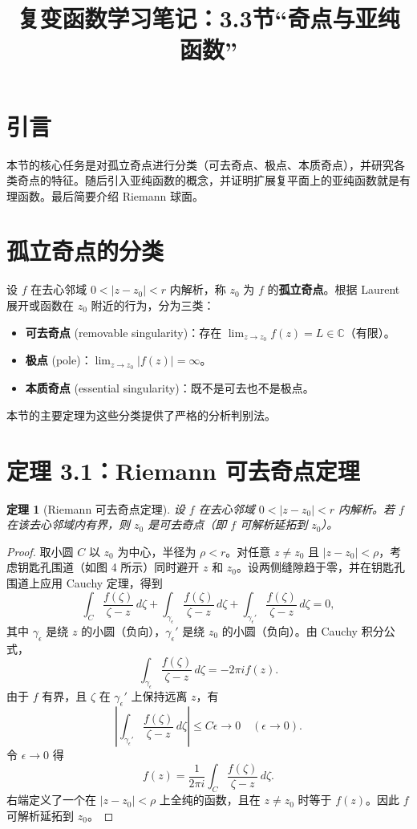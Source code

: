 \documentclass[UTF8]{ctexart}
\title{复变函数学习笔记：3.3节“奇点与亚纯函数”}
\date{}
\newtheorem{theorem}{定理}[section]
\numberwithin{equation}{section}
\newcommand{\CC}{\mathbb{C}}
\begin{document}
\maketitle

\section{引言}
本节的核心任务是对孤立奇点进行分类（可去奇点、极点、本质奇点），并研究各类奇点的特征。随后引入亚纯函数的概念，并证明扩展复平面上的亚纯函数就是有理函数。最后简要介绍 Riemann 球面。

\section{孤立奇点的分类}
设 \(f\) 在去心邻域 \(0<|z-z_0|<r\) 内解析，称 \(z_0\) 为 \(f\) 的\textbf{孤立奇点}。根据 Laurent 展开或函数在 \(z_0\) 附近的行为，分为三类：
\begin{itemize}
\item \textbf{可去奇点} (removable singularity)：存在 \(\lim_{z\to z_0} f(z) = L\in \CC\)（有限）。
\item \textbf{极点} (pole)：\(\lim_{z\to z_0} |f(z)| = \infty\)。
\item \textbf{本质奇点} (essential singularity)：既不是可去也不是极点。
\end{itemize}
本节的主要定理为这些分类提供了严格的分析判别法。

\section{定理 3.1：Riemann 可去奇点定理}
\begin{theorem}[Riemann 可去奇点定理]
设 \(f\) 在去心邻域 \(0<|z-z_0|<r\) 内解析。若 \(f\) 在该去心邻域内有界，则 \(z_0\) 是可去奇点（即 \(f\) 可解析延拓到 \(z_0\)）。
\end{theorem}

\begin{proof}
取小圆 \(C\) 以 \(z_0\) 为中心，半径为 \(\rho<r\)。对任意 \(z\neq z_0\) 且 \(|z-z_0|<\rho\)，考虑钥匙孔围道（如图 4 所示）同时避开 \(z\) 和 \(z_0\)。设两侧缝隙趋于零，并在钥匙孔围道上应用 Cauchy 定理，得到
\[
\int_C \frac{f(\zeta)}{\zeta-z}\,d\zeta + \int_{\gamma_\epsilon} \frac{f(\zeta)}{\zeta-z}\,d\zeta + \int_{\gamma_\epsilon'} \frac{f(\zeta)}{\zeta-z}\,d\zeta = 0,
\]
其中 \(\gamma_\epsilon\) 是绕 \(z\) 的小圆（负向），\(\gamma_\epsilon'\) 是绕 \(z_0\) 的小圆（负向）。由 Cauchy 积分公式，
\[
\int_{\gamma_\epsilon} \frac{f(\zeta)}{\zeta-z}\,d\zeta = -2\pi i f(z).
\]
由于 \(f\) 有界，且 \(\zeta\) 在 \(\gamma_\epsilon'\) 上保持远离 \(z\)，有
\[
\left|\int_{\gamma_\epsilon'} \frac{f(\zeta)}{\zeta-z}\,d\zeta\right| \le C\epsilon \to 0 \quad (\epsilon\to0).
\]
令 \(\epsilon\to0\) 得
\[
f(z) = \frac{1}{2\pi i}\int_C \frac{f(\zeta)}{\zeta-z}\,d\zeta.
\]
右端定义了一个在 \(|z-z_0|<\rho\) 上全纯的函数，且在 \(z\neq z_0\) 时等于 \(f(z)\)。因此 \(f\) 可解析延拓到 \(z_0\)。
\end{proof}
\end{document}
